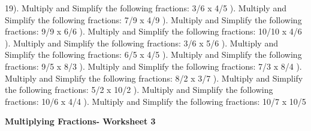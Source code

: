 \documentclass{article}%
\begin{document}
19). Multiply and Simplify the following fractions: 3/6 x 4/5%
\newline%
\newline%
). Multiply and Simplify the following fractions: 7/9 x 4/9%
\newline%
\newline%
). Multiply and Simplify the following fractions: 9/9 x 6/6%
\newline%
\newline%
). Multiply and Simplify the following fractions: 10/10 x 4/6%
\newline%
\newline%
). Multiply and Simplify the following fractions: 3/6 x 5/6%
\newline%
\newline%
). Multiply and Simplify the following fractions: 6/5 x 4/5%
\newline%
\newline%
). Multiply and Simplify the following fractions: 9/5 x 8/3%
\newline%
\newline%
). Multiply and Simplify the following fractions: 7/3 x 8/4%
\newline%
\newline%
). Multiply and Simplify the following fractions: 8/2 x 3/7%
\newline%
\newline%
). Multiply and Simplify the following fractions: 5/2 x 10/2%
\newline%
\newline%
). Multiply and Simplify the following fractions: 10/6 x 4/4%
\newline%
\newline%
). Multiply and Simplify the following fractions: 10/7 x 10/5%
\newline%
\newline%
\newline%
\pagebreak%
\large%
\begin{center}%
\textbf{Multiplying Fractions- Worksheet 3}%
\newline%
\end{center} \normalsize%
\end{document}

